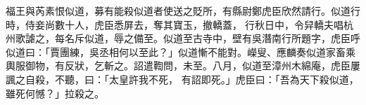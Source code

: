 \begin{pinyinscope}
 福王與芮素恨似道，募有能殺似道者使送之貶所，有縣尉鄭虎臣欣然請行。似道行時，侍妾尚數十人，虎臣悉屏去，奪其寶玉，撤轎蓋，𣌈行秋日中，令舁轎夫唱杭州歌謔之，每名斥似道，辱之備至。似道至古寺中，壁有吳潛南行所題字，虎臣呼似道曰：「賈團練，吳丞相何以至此？」似道慚不能對。嶸叟、應麟奏似道家畜乘輿服御物，有反狀，乞斬之。詔遣鞫問，未至。八月，似道至漳州木綿庵，虎臣屢諷之自殺，不聽，曰：「太皇許我不死，
 有詔即死。」虎臣曰：「吾為天下殺似道，雖死何憾？」拉殺之。



\end{pinyinscope}